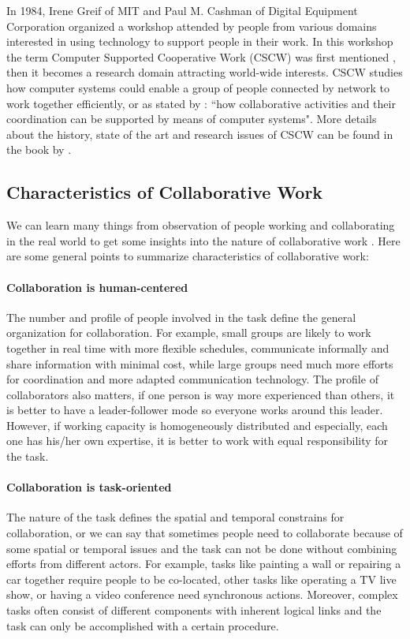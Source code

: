 In 1984, Irene Greif of MIT and Paul M. Cashman of Digital Equipment Corporation organized a workshop attended by people from various domains interested in using technology to support people in their work. In this workshop the term Computer Supported Cooperative Work (CSCW) was first mentioned \citep{Grudin1994Computer}, then it becomes a research domain attracting world-wide interests. CSCW studies how computer systems could enable a group of people connected by network to work together efficiently, or as stated by \citet{Carstensen1999CSCW}: ``how collaborative activities and their coordination can be supported by means of computer systems". More details about the history, state of the art and research issues of CSCW can be found in the book by \citet{Beaudouin1999CSCW}.


\subsection{Characteristics of Collaborative Work}
We can learn many things from observation of people working and collaborating in the real world to get some insights into the nature of collaborative work \citep{Churchill1998CVE}. Here are some general points to summarize characteristics of collaborative work:

\paragraph{Collaboration is human-centered} The number and profile of people involved in the task define the general organization for collaboration. For example, small groups are likely to work together in real time with more flexible schedules, communicate informally and share information with minimal cost, while large groups need much more efforts for coordination and more adapted communication technology. The profile of collaborators also matters, if one person is way more experienced than others, it is better to have a leader-follower mode so everyone works around this leader. However, if working capacity is homogeneously distributed and especially, each one has his/her own expertise, it is better to work with equal responsibility for the task.

\paragraph{Collaboration is task-oriented} The nature of the task defines the spatial and temporal constrains for collaboration, or we can say that sometimes people need to collaborate because of some spatial or temporal issues and the task can not be done without combining efforts from different actors. For example, tasks like painting a wall or repairing a car together require people to be co-located, other tasks like operating a TV live show, or having a video conference need synchronous actions. Moreover, complex tasks often consist of different components with inherent logical links and the task can only be accomplished with a certain procedure.  

